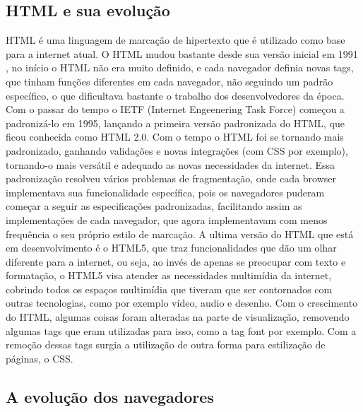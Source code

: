 \subsection{HTML e sua evolução}

HTML é uma linguagem de marcação de hipertexto que é utilizado como base para a internet
atual. O HTML mudou bastante desde sua versão inicial em 1991
\cite{powell2003html}, no início o HTML não era muito definido, e cada
navegador definia novas tags, que tinham funções diferentes em cada
navegador, não seguindo um padrão específico, o que dificultava
bastante o trabalho dos desenvolvedores da época. Com o passar do
tempo o IETF (Internet Engeenering Task Force) começou a padronizá-lo em 1995, lançando a
primeira versão padronizada do HTML, que ficou conhecida como HTML 2.0.
Com o tempo o HTML foi se tornando mais padronizado, ganhando validações e novas integrações
(com CSS por exemplo), tornando-o mais versátil e adequado as novas necessidades da
internet.
Essa padronização resolveu vários problemas de fragmentação, onde cada
browser implementava sua funcionalidade específica, pois os
navegadores puderam começar a seguir as especificações padronizadas,
facilitando assim as implementações de cada navegador, que agora implementavam com
menos frequência o seu próprio estilo de marcação.
A ultima versão do HTML que está em desenvolvimento é o HTML5, que traz funcionalidades
que dão um olhar diferente para a internet, ou seja, ao invés de apenas se preocupar com texto
e formatação, o HTML5 visa atender as necessidades multimídia da internet, cobrindo
todos os espaços multimídia que tiveram que ser contornados com outras tecnologias,
como por exemplo vídeo, audio e desenho.
Com o crescimento do HTML, algumas coisas foram alteradas na parte de visualização,
removendo algumas tags que eram utilizadas para isso, como a tag font
por exemplo.
Com a remoção dessas tags surgia a utilização de outra forma para
estilização de páginas, o CSS.

\subsection{A evolução dos navegadores}

